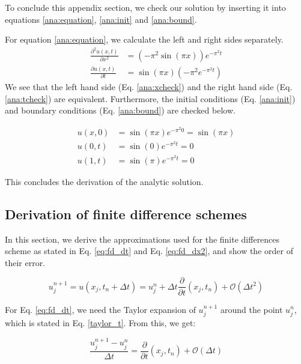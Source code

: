 To conclude this appendix section, we check our solution by inserting it into equations \ref{ana:equation}, \ref{ana:init} and \ref{ana:bound}.

For equation \ref{ana:equation}, we calculate the left and right sides separately.
\begin{align}
    \label{ana:xcheck}
    \frac{\partial^2 u(x,t)}{\partial x^2} &= \left(-\pi^2 \sin(\pi x)\right) e^{-\pi^2 t} \\
    \label{ana:tcheck}
    \frac{\partial u(x,t)}{\partial t} &=  \sin(\pi x) \left(-\pi^2 e^{-\pi^2 t}\right)
\end{align}
We see that the left hand side (Eq. \ref{ana:xcheck}) and the right hand side (Eq. \ref{ana:tcheck}) are equivalent.
Furthermore, the initial conditions (Eq. \ref{ana:init}) and boundary conditions (Eq. \ref{ana:bound}) are checked below.

\begin{align*}
    u(x, 0) &= \sin(\pi x) e^{-\pi^2 0} = \sin(\pi x) \\
    u(0, t) &= \sin(0)e^{-\pi^2 t} = 0 \\
    u(1, t) &= \sin(\pi)e^{-\pi^2 t} = 0
\end{align*}

This concludes the derivation of the analytic solution.
\clearpage

\subsection{Derivation of finite difference schemes} \label{appendixC}
In this section, we derive the approximations used for the finite differences scheme as stated in Eq. \eqref{eq:fd_dt} and Eq. \eqref{eq:fd_dx2}, and show the order of their error.

\begin{equation} \label{taylor_t}
    u_j^{n+1} = u(x_j, t_n + \Delta t)
    = u_j^n + \Delta t \frac{\partial}{\partial t}(x_j, t_n) + \mathcal{O}(\Delta t^2)
\end{equation}

For Eq. \eqref{eq:fd_dt}, we need the Taylor expansion of $u_j^{n+1}$ around the point $u_j^n$, which is stated in Eq. \eqref{taylor_t}.
From this, we get:

\begin{equation}
    \frac{u_j^{n+1} - u_j^n}{\Delta t} = \frac{\partial}{\partial t}(x_j, t_n) + \mathcal{O}(\Delta t)
\end{equation}

